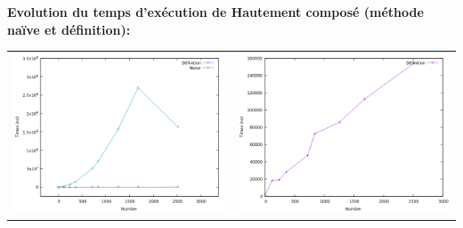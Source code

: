 		\begin{frame}
		\textbf{Evolution du temps d'exécution de Hautement composé (méthode naïve et définition): }
			\begin{center}\footnotesize\begin{longtable}{l l}		
	\includegraphics[scale=0.27]{HC.png}  & \includegraphics[scale=0.27]{HCdef.png}\\
	\end{longtable}\vspace{-2.2em}\end{center}
		\end{frame}
		
